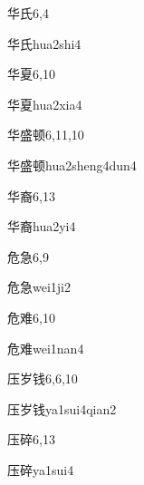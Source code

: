 \begin{entry}{华氏}{6,4}
  \begin{phonetics}{华氏}{hua2shi4}
  \end{phonetics}
\end{entry}

\begin{entry}{华夏}{6,10}
  \begin{phonetics}{华夏}{hua2xia4}
  \end{phonetics}
\end{entry}

\begin{entry}{华盛顿}{6,11,10}
  \begin{phonetics}{华盛顿}{hua2sheng4dun4}
  \end{phonetics}
\end{entry}

\begin{entry}{华裔}{6,13}
  \begin{phonetics}{华裔}{hua2yi4}
  \end{phonetics}
\end{entry}

\begin{entry}{危急}{6,9}
  \begin{phonetics}{危急}{wei1ji2}
  \end{phonetics}
\end{entry}

\begin{entry}{危难}{6,10}
  \begin{phonetics}{危难}{wei1nan4}
  \end{phonetics}
\end{entry}

\begin{entry}{压岁钱}{6,6,10}
  \begin{phonetics}{压岁钱}{ya1sui4qian2}
  \end{phonetics}
\end{entry}

\begin{entry}{压碎}{6,13}
  \begin{phonetics}{压碎}{ya1sui4}
  \end{phonetics}
\end{entry}

